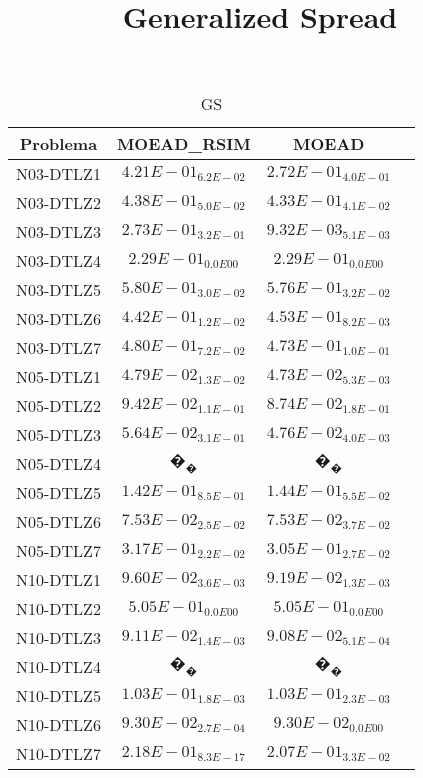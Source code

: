 \documentclass{article}
\title{Generalized Spread}
\author{}
\begin{document}
\maketitle
\begin{table*}[ht!]
\scriptsize
\caption{GS}
\centering\begin{tabular}{|c||c||c||c|} \hline
Problema &MOEAD_RSIM &MOEAD\\\hline
N03-DTLZ1 &\cellcolor{gray25}$4.21E-01_{6.2E-02}$ &\cellcolor{gray95}$2.72E-01_{4.0E-01}$\\ 
\hline
N03-DTLZ2 &\cellcolor{gray25}$4.38E-01_{5.0E-02}$ &\cellcolor{gray95}$4.33E-01_{4.1E-02}$\\ 
\hline
N03-DTLZ3 &\cellcolor{gray25}$2.73E-01_{3.2E-01}$ &\cellcolor{gray95}$9.32E-03_{5.1E-03}$\\ 
\hline
N03-DTLZ4 &\cellcolor{gray95}$2.29E-01_{0.0E00}$ &\cellcolor{gray25}$2.29E-01_{0.0E00}$\\ 
\hline
N03-DTLZ5 &\cellcolor{gray25}$5.80E-01_{3.0E-02}$ &\cellcolor{gray95}$5.76E-01_{3.2E-02}$\\ 
\hline
N03-DTLZ6 &\cellcolor{gray95}$4.42E-01_{1.2E-02}$ &\cellcolor{gray25}$4.53E-01_{8.2E-03}$\\ 
\hline
N03-DTLZ7 &\cellcolor{gray25}$4.80E-01_{7.2E-02}$ &\cellcolor{gray95}$4.73E-01_{1.0E-01}$\\ 
\hline
N05-DTLZ1 &\cellcolor{gray25}$4.79E-02_{1.3E-02}$ &\cellcolor{gray95}$4.73E-02_{5.3E-03}$\\ 
\hline
N05-DTLZ2 &\cellcolor{gray25}$9.42E-02_{1.1E-01}$ &\cellcolor{gray95}$8.74E-02_{1.8E-01}$\\ 
\hline
N05-DTLZ3 &\cellcolor{gray25}$5.64E-02_{3.1E-01}$ &\cellcolor{gray95}$4.76E-02_{4.0E-03}$\\ 
\hline
N05-DTLZ4 &\cellcolor{gray25}$�_{�}$ &$�_{�}$\\ 
\hline
N05-DTLZ5 &\cellcolor{gray95}$1.42E-01_{8.5E-01}$ &\cellcolor{gray25}$1.44E-01_{5.5E-02}$\\ 
\hline
N05-DTLZ6 &\cellcolor{gray25}$7.53E-02_{2.5E-02}$ &\cellcolor{gray95}$7.53E-02_{3.7E-02}$\\ 
\hline
N05-DTLZ7 &\cellcolor{gray25}$3.17E-01_{2.2E-02}$ &\cellcolor{gray95}$3.05E-01_{2.7E-02}$\\ 
\hline
N10-DTLZ1 &\cellcolor{gray25}$9.60E-02_{3.6E-03}$ &\cellcolor{gray95}$9.19E-02_{1.3E-03}$\\ 
\hline
N10-DTLZ2 &\cellcolor{gray95}$5.05E-01_{0.0E00}$ &\cellcolor{gray25}$5.05E-01_{0.0E00}$\\ 
\hline
N10-DTLZ3 &\cellcolor{gray25}$9.11E-02_{1.4E-03}$ &\cellcolor{gray95}$9.08E-02_{5.1E-04}$\\ 
\hline
N10-DTLZ4 &\cellcolor{gray25}$�_{�}$ &$�_{�}$\\ 
\hline
N10-DTLZ5 &\cellcolor{gray95}$1.03E-01_{1.8E-03}$ &\cellcolor{gray25}$1.03E-01_{2.3E-03}$\\ 
\hline
N10-DTLZ6 &\cellcolor{gray25}$9.30E-02_{2.7E-04}$ &\cellcolor{gray95}$9.30E-02_{0.0E00}$\\ 
\hline
N10-DTLZ7 &\cellcolor{gray25}$2.18E-01_{8.3E-17}$ &\cellcolor{gray95}$2.07E-01_{3.3E-02}$\\ 
\hline
\end{tabular}
\end{table*}
\end{document}
